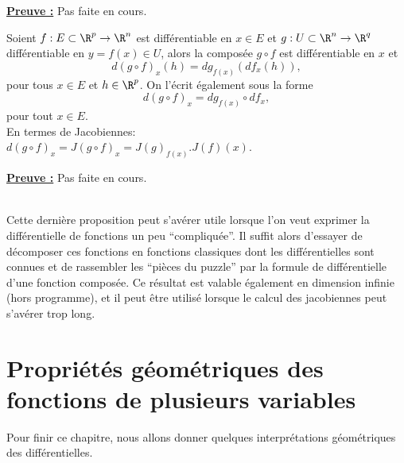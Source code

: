 \documentclass[class=report,crop=false]{standalone}
\begin{document}
\noindent \underline{\bf Preuve :}
Pas faite en cours.

 \begin{proposition}[COMPOSITION]
\textcolor[rgb]{0.50,0.00,0.25}{
Soient $f: E \subset \R^p \rightarrow \R^n$ est différentiable en $x \in E$ et  $g: U \subset \R^n \rightarrow \R^q$ différentiable en $y=f(x) \in U$, alors la composée 
$g \circ f$ est différentiable en $x$  et  
\begin{equation*}
d(g \circ f)_x (h)= dg_{f(x)}(df_x(h)),
\end{equation*}
pour tous $x \in E$ et $h \in  \R^p$. On l'écrit également sous la forme
\begin{equation*}
d(g \circ f)_x = dg_{f(x)} \circ df_x,
\end{equation*}
pour tout $x \in E$.
 \\
En termes de Jacobiennes:\\
$d(g \circ f)_x=J(g \circ f)_x= J(g)_{f(x)}. J(f)(x)$.
}
\end{proposition}

\noindent \underline{\bf Preuve :}
Pas faite en cours.

  \begin{remarque*}
\textcolor[rgb]{0.00,0.00,1.00}{ \\
Cette dernière proposition peut s'avérer utile lorsque l'on veut exprimer la différentielle de
fonctions un peu ``compliquée''. Il suffit alors d'essayer de décomposer ces fonctions
en fonctions classiques dont les différentielles sont connues et de rassembler les ``pièces du puzzle'' par la formule de différentielle d'une fonction composée. Ce résultat est valable 
également en dimension infinie (hors programme), et il peut être utilisé lorsque le calcul
des jacobiennes peut s'avérer trop long. 
}
\end{remarque*}

\section{Propriétés géométriques des fonctions de plusieurs variables}
\noindent Pour finir ce chapitre, nous allons donner quelques interprétations
géométriques des différentielles. 
\end{document}
